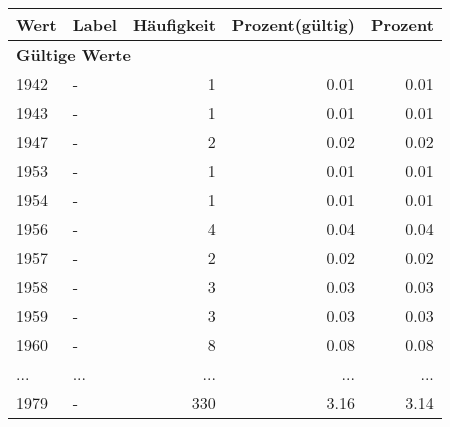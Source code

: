      \begin{longtable}{lXrrr}
     \toprule
     \textbf{Wert} & \textbf{Label} & \textbf{Häufigkeit} & \textbf{Prozent(gültig)} & \textbf{Prozent} \\
     \endhead
     \midrule
     \multicolumn{5}{l}{\textbf{Gültige Werte}}\\
        1942 & \multicolumn{1}{X}{-} & %
          \num{1} &
          \num[round-mode=places,round-precision=2]{0.01} &
          \num[round-mode=places,round-precision=2]{0.01} \\
        1943 & \multicolumn{1}{X}{-} & %
          \num{1} &
          \num[round-mode=places,round-precision=2]{0.01} &
          \num[round-mode=places,round-precision=2]{0.01} \\
        1947 & \multicolumn{1}{X}{-} & %
          \num{2} &
          \num[round-mode=places,round-precision=2]{0.02} &
          \num[round-mode=places,round-precision=2]{0.02} \\
        1953 & \multicolumn{1}{X}{-} & %
          \num{1} &
          \num[round-mode=places,round-precision=2]{0.01} &
          \num[round-mode=places,round-precision=2]{0.01} \\
        1954 & \multicolumn{1}{X}{-} & %
          \num{1} &
          \num[round-mode=places,round-precision=2]{0.01} &
          \num[round-mode=places,round-precision=2]{0.01} \\
        1956 & \multicolumn{1}{X}{-} & %
          \num{4} &
          \num[round-mode=places,round-precision=2]{0.04} &
          \num[round-mode=places,round-precision=2]{0.04} \\
        1957 & \multicolumn{1}{X}{-} & %
          \num{2} &
          \num[round-mode=places,round-precision=2]{0.02} &
          \num[round-mode=places,round-precision=2]{0.02} \\
        1958 & \multicolumn{1}{X}{-} & %
          \num{3} &
          \num[round-mode=places,round-precision=2]{0.03} &
          \num[round-mode=places,round-precision=2]{0.03} \\
        1959 & \multicolumn{1}{X}{-} & %
          \num{3} &
          \num[round-mode=places,round-precision=2]{0.03} &
          \num[round-mode=places,round-precision=2]{0.03} \\
        1960 & \multicolumn{1}{X}{-} & %
          \num{8} &
          \num[round-mode=places,round-precision=2]{0.08} &
          \num[round-mode=places,round-precision=2]{0.08} \\
       ... & ... & ... & ... & ... \\
        1979 & \multicolumn{1}{X}{-} & %
          \num{330} &
          \num[round-mode=places,round-precision=2]{3.16} &
          \num[round-mode=places,round-precision=2]{3.14} \\


\end{longtable}
